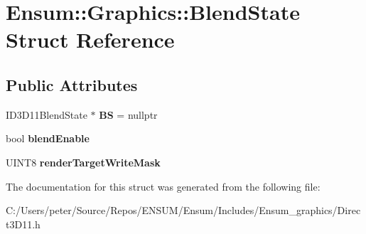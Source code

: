 \hypertarget{struct_ensum_1_1_graphics_1_1_blend_state}{}\section{Ensum\+:\+:Graphics\+:\+:Blend\+State Struct Reference}
\label{struct_ensum_1_1_graphics_1_1_blend_state}
\subsection*{Public Attributes}
\begin{DoxyCompactItemize}
\item 
I\+D3\+D11\+Blend\+State $\ast$ {\bfseries BS} = nullptr\hypertarget{struct_ensum_1_1_graphics_1_1_blend_state_a0ce686fcc0b0c38b058a1c1977ad7be6}{}\label{struct_ensum_1_1_graphics_1_1_blend_state_a0ce686fcc0b0c38b058a1c1977ad7be6}

\item 
bool {\bfseries blend\+Enable}\hypertarget{struct_ensum_1_1_graphics_1_1_blend_state_a1e940827058e22a9c21955d62a6103bf}{}\label{struct_ensum_1_1_graphics_1_1_blend_state_a1e940827058e22a9c21955d62a6103bf}

\item 
U\+I\+N\+T8 {\bfseries render\+Target\+Write\+Mask}\hypertarget{struct_ensum_1_1_graphics_1_1_blend_state_a4861251852e483bfb81d94d49ee8f432}{}\label{struct_ensum_1_1_graphics_1_1_blend_state_a4861251852e483bfb81d94d49ee8f432}

\end{DoxyCompactItemize}


The documentation for this struct was generated from the following file\+:\begin{DoxyCompactItemize}
\item 
C\+:/\+Users/peter/\+Source/\+Repos/\+E\+N\+S\+U\+M/\+Ensum/\+Includes/\+Ensum\+\_\+graphics/Direct3\+D11.\+h\end{DoxyCompactItemize}
